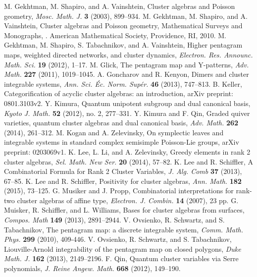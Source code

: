 \documentclass{amsart}
\theoremstyle{definition}
\theoremstyle{remark}
\numberwithin{equation}{section}
\begin{document}
\begin{thebibliography}{99}
	 M. Gekhtman, M. Shapiro, and A. Vainshtein,  Cluster algebras and Poisson geometry, \textsl{Mosc. Math. J.} \textbf{3} (2003), 899--934.
   M. Gekhtman, M. Shapiro, and A. Vainshtein,  Cluster algebras and Poisson geometry, Mathematical Surveys and Monographs, . American Mathematical Society, Providence, RI, 2010.
	 M. Gekhtman, M. Shapiro, S. Tabachnikov, and A. Vainshtein, Higher pentagram maps, weighted directed networks, and cluster dynamics, \textsl{Electron. Res. Announc. Math. Sci.} \textbf{19} (2012), 1--17.
	 M. Glick, The pentagram map and Y-patterns, \textsl{Adv. Math.} \textbf{227} (2011), 1019--1045.
	 A. Goncharov and R. Kenyon, Dimers and cluster integrable systems, \textsl{Ann. Sci. \'Ec. Norm. Sup\'er.} \textbf{46} (2013), 747--813.
   B. Keller, Categorification of acyclic cluster algebras: an introduction, arXiv preprint: 0801.3103v2.
   Y. Kimura, Quantum unipotent subgroup and dual canonical basis, \textsl{Kyoto J. Math.} \textbf{52} (2012), no. 2, 277--331.
   Y. Kimura and F. Qin, Graded quiver varieties, quantum cluster algebras and dual canonical basis, \textsl{Adv. Math.} \textbf{262} (2014), 261--312.
   M. Kogan and A. Zelevinsky, On symplectic leaves and integrable systems in standard complex semisimple Poisson-Lie groups, arXiv preprint: 0203069v1.
   K. Lee, L. Li, and A. Zelevinsky, Greedy elements in rank 2 cluster algebras, \textsl{Sel. Math. New Ser.} \textbf{20} (2014), 57--82.
   K. Lee and R. Schiffler, A Combinatorial Formula for Rank 2 Cluster Variables, \textsl{J. Alg. Comb} \textbf{37} (2013), 67--85.
   K. Lee and R. Schiffler, Positivity for cluster algebras, \textsl{Ann. Math.} \textbf{182} (2015), 73--125.
	 G. Musiker and J. Propp, Combinatorial interpretations for rank-two cluster algebras of affine type, \textsl{ Electron. J. Combin.} \textbf{14} (2007), 23 pp.
	 G. Muisker, R. Schiffler, and L. Williams, Bases for cluster algebras from surfaces, \textsl{Compos. Math} \textbf{149} (2013), 2891--2944.
	 V. Ovsienko, R. Schwartz, and S. Tabachnikov, The pentagram map: a discrete integrable system, \textsl{Comm. Math. Phys.} \textbf{299} (2010), 409-446.
	 V. Ovsienko, R. Schwartz, and S. Tabachnikov, Liouville-Arnold integrability of the pentagram map on closed polygons, \textsl{Duke Math. J.} \textbf{162} (2013), 2149--2196.
   F. Qin, Quantum cluster variables via Serre polynomials, \textsl{J. Reine Angew. Math.} \textbf{668} (2012), 149--190.

\end{thebibliography}
\end{document}
